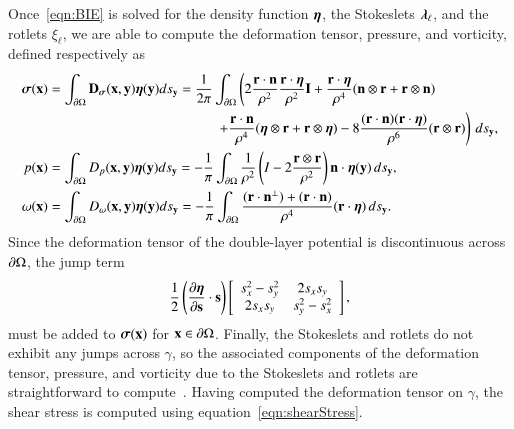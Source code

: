 \documentclass[preprint,10pt]{elsarticle}
\begin{document}
Once~\eqref{eqn:BIE} is solved for the density function ${\boldsymbol\eta}$, the
Stokeslets ${\boldsymbol\lambda}_\ell$, and the rotlets $\xi_\ell$, we are able to
compute the deformation tensor, pressure, and vorticity, defined
respectively as
\begin{align}
  \label{eqn:deformationDLP} 
  \ssigma(\xx) &= \int_{\bd\Omega} \mathbf{D}_{\ssigma}(\xx,\yy) 
      \eeta(\yy) ds_{\yy} 
  = \frac{1}{2\pi}\int_{\bd\Omega} \left(
    2\frac{\rr \cdot \nn}{\rho^2} \frac{\rr \cdot \eeta}{\rho^2} \II + 
    \frac{\rr \cdot \eeta}{\rho^4} (\nn \otimes \rr + \rr \otimes \nn) 
    \right. \nonumber \\
    & \qquad\qquad\qquad\qquad\qquad\qquad \left.
    +\frac{\rr \cdot \nn}{\rho^4} (\eeta \otimes \rr + \rr \otimes \eeta) - 
    8\frac{(\rr \cdot \nn)(\rr \cdot \eeta)}{\rho^6}(\rr \otimes \rr)
    \right) \, ds_\yy, \\
%
  p(\xx) &= \int_{\bd\Omega} D_{p}(\xx,\yy) 
      \eeta(\yy) ds_{\yy} 
  = -\frac{1}{\pi}\int_{\bd\Omega} \frac{1}{\rho^2}
    \left(I - 2 \frac{\rr \otimes \rr}{\rho^2}\right) \nn \cdot
      \eeta(\yy)\,ds_\yy, \\
%
  \label{eqn:vorticityDLP} 
  \omega(\xx) &= \int_{\bd\Omega} D_{\omega}(\xx,\yy) 
      \eeta(\yy) ds_{\yy} 
  = -\frac{1}{\pi} \int_{\bd\Omega}
    \frac{(\rr \cdot \nn^\perp) + (\rr \cdot \nn)}{\rho^4} 
      (\rr \cdot \eeta) \, ds_\yy.
\end{align}
Since the deformation tensor of the double-layer potential is
discontinuous across ${\partial}\Omega$, the jump term 
\begin{align}
  \frac{1}{2} \left(\frac{\partial {\boldsymbol\eta}}{\partial {\mathbf{s}}} \cdot {\mathbf{s}} \right) \left[
    \begin{array}{cc}
      s_x^2 - s_y^2 & 2s_x s_y \\ 2s_x s_y & s_y^2 - s_x^2
    \end{array}
  \right],
  \label{eqn:deformationJump}
\end{align}
must be added to ${\boldsymbol\sigma}({\mathbf{x}})$ for ${\mathbf{x}} \in {\partial}\Omega$.  Finally, the
Stokeslets and rotlets do not exhibit any jumps across $\gamma$, so the
associated components of the deformation tensor, pressure, and vorticity
due to the Stokeslets and rotlets are straightforward to
compute~\cite{poz1992}.  Having computed the deformation tensor on
$\gamma$, the shear stress is computed using
equation~\eqref{eqn:shearStress}.  

\end{document}
